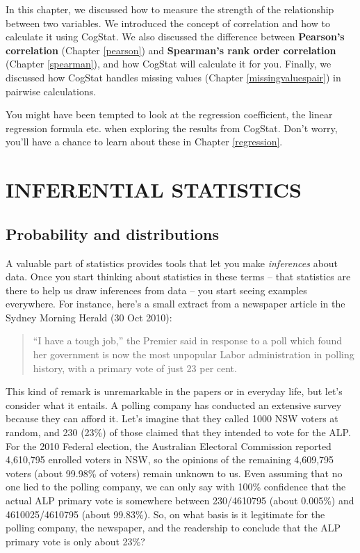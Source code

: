 \documentclass[
  11pt,
  a4paper,
  twoside,symmetric,openright]{book}
\theoremstyle{break}
\theoremstyle{break}
\begin{document}
In this chapter, we discussed how to measure the strength of the relationship between two variables. We introduced the concept of correlation and how to calculate it using CogStat. We also discussed the difference between \textbf{Pearson's correlation} (Chapter \ref{pearson}) and \textbf{Spearman's rank order correlation} (Chapter \ref{spearman}), and how CogStat will calculate it for you. Finally, we discussed how CogStat handles missing values (Chapter \ref{missingvaluespair}) in pairwise calculations.

You might have been tempted to look at the regression coefficient, the linear regression formula etc. when exploring the results from CogStat. Don't worry, you'll have a chance to learn about these in Chapter \ref{regression}.

\part*{INFERENTIAL STATISTICS}\label{part-inferential-statistics}

\chapter{Probability and distributions}\label{probability}

A valuable part of statistics provides tools that let you make \emph{inferences} about data. Once you start thinking about statistics in these terms -- that statistics are there to help us draw inferences from data -- you start seeing examples everywhere. For instance, here's a small extract from a newspaper article in the Sydney Morning Herald (30 Oct 2010):

\begin{quote}
``I have a tough job,'' the Premier said in response to a poll which found her government is now the most unpopular Labor administration in polling history, with a primary vote of just 23 per cent.
\end{quote}

This kind of remark is unremarkable in the papers or in everyday life, but let's consider what it entails. A polling company has conducted an extensive survey because they can afford it. Let's imagine that they called 1000 NSW voters at random, and 230 (23\%) of those claimed that they intended to vote for the ALP. For the 2010 Federal election, the Australian Electoral Commission reported 4,610,795 enrolled voters in NSW, so the opinions of the remaining 4,609,795 voters (about 99.98\% of voters) remain unknown to us. Even assuming that no one lied to the polling company, we can only say with 100\% confidence that the actual ALP primary vote is somewhere between 230/4610795 (about 0.005\%) and 4610025/4610795 (about 99.83\%). So, on what basis is it legitimate for the polling company, the newspaper, and the readership to conclude that the ALP primary vote is only about 23\%?
\end{document}

